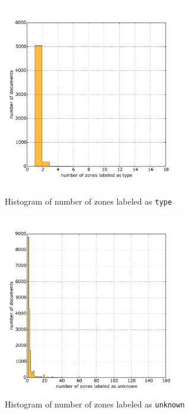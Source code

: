 \begin{appendix}
  \begin{figure}
\centering
\begin{minipage}[t!]{0.48\linewidth}
  \includegraphics[width=8cm]{plots/type_histogram}
  \caption{Histogram of number of zones labeled as \texttt{type}}
  \label{fig:type_histogram}
\end{minipage}
\quad
\begin{minipage}[t!]{0.48\linewidth}
  \includegraphics[width=8cm]{plots/unknown_histogram}
  \caption{Histogram of number of zones labeled as \texttt{unknown}}
  \label{fig:unknown_histogram}
\end{minipage}
\end{figure}

\end{appendix}